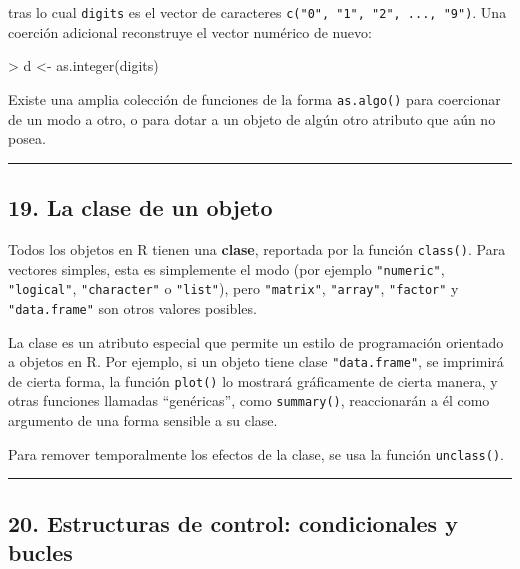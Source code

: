 \documentclass[
  jou,
  floatsintext,
  longtable,
  a4paper,
  nolmodern,
  notxfonts,
  notimes,
  12pt,
  colorlinks=true,linkcolor=blue,citecolor=blue,urlcolor=blue]{apa7}
\newenvironment{Shaded}{\begin{snugshade}}{\end{snugshade}}
\newcommand{\FunctionTok}[1]{\textcolor[rgb]{0.28,0.35,0.67}{#1}}
\newcommand{\NormalTok}[1]{\textcolor[rgb]{0.00,0.23,0.31}{#1}}
\newcommand{\OtherTok}[1]{\textcolor[rgb]{0.00,0.23,0.31}{#1}}
\newcommand{\SpecialCharTok}[1]{\textcolor[rgb]{0.37,0.37,0.37}{#1}}
\begin{document}
tras lo cual \texttt{digits} es el vector de caracteres
\texttt{c("0",\ "1",\ "2",\ ...,\ "9")}. Una coerción adicional
reconstruye el vector numérico de nuevo:

\begin{Shaded}
\begin{Highlighting}[]
\SpecialCharTok{\textgreater{}}\NormalTok{ d }\OtherTok{\textless{}{-}} \FunctionTok{as.integer}\NormalTok{(digits)}
\end{Highlighting}
\end{Shaded}

Existe una amplia colección de funciones de la forma \texttt{as.algo()}
para coercionar de un modo a otro, o para dotar a un objeto de algún
otro atributo que aún no posea.

\begin{center}\rule{0.5\linewidth}{0.5pt}\end{center}

\subsection{19. La clase de un objeto}\label{la-clase-de-un-objeto}

Todos los objetos en R tienen una \textbf{clase}, reportada por la
función \texttt{class()}. Para vectores simples, esta es simplemente el
modo (por ejemplo \texttt{"numeric"}, \texttt{"logical"},
\texttt{"character"} o \texttt{"list"}), pero \texttt{"matrix"},
\texttt{"array"}, \texttt{"factor"} y \texttt{"data.frame"} son otros
valores posibles.

La clase es un atributo especial que permite un estilo de programación
orientado a objetos en R. Por ejemplo, si un objeto tiene clase
\texttt{"data.frame"}, se imprimirá de cierta forma, la función
\texttt{plot()} lo mostrará gráficamente de cierta manera, y otras
funciones llamadas ``genéricas'', como \texttt{summary()}, reaccionarán
a él como argumento de una forma sensible a su clase.

Para remover temporalmente los efectos de la clase, se usa la función
\texttt{unclass()}.

\begin{center}\rule{0.5\linewidth}{0.5pt}\end{center}

\subsection{20. Estructuras de control: condicionales y
bucles}\label{estructuras-de-control-condicionales-y-bucles}
\end{document}
